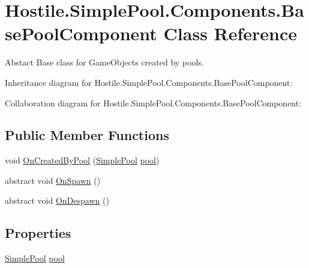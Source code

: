 \hypertarget{class_hostile_1_1_simple_pool_1_1_components_1_1_base_pool_component}{\section{Hostile.\-Simple\-Pool.\-Components.\-Base\-Pool\-Component Class Reference}
\label{class_hostile_1_1_simple_pool_1_1_components_1_1_base_pool_component}
}


Abstact Base class for Game\-Objects created by pools.  




Inheritance diagram for Hostile.\-Simple\-Pool.\-Components.\-Base\-Pool\-Component\-:


Collaboration diagram for Hostile.\-Simple\-Pool.\-Components.\-Base\-Pool\-Component\-:
\subsection*{Public Member Functions}
\begin{DoxyCompactItemize}
\item 
void \hyperlink{class_hostile_1_1_simple_pool_1_1_components_1_1_base_pool_component_a321fc31c13e8a143a090822ee7b9eb02}{On\-Created\-By\-Pool} (\hyperlink{class_hostile_1_1_simple_pool_1_1_simple_pool}{Simple\-Pool} \hyperlink{class_hostile_1_1_simple_pool_1_1_components_1_1_base_pool_component_ac2a2a4f41f20b50d8f3c2ea545461c72}{pool})
\item 
abstract void \hyperlink{class_hostile_1_1_simple_pool_1_1_components_1_1_base_pool_component_ae79737959baf9cdf23d2bf77fc359cf7}{On\-Spawn} ()
\item 
abstract void \hyperlink{class_hostile_1_1_simple_pool_1_1_components_1_1_base_pool_component_acee7cd5b2e3790c85b0b7816d6578d72}{On\-Despawn} ()
\end{DoxyCompactItemize}
\subsection*{Properties}
\begin{DoxyCompactItemize}
\item 
\hyperlink{class_hostile_1_1_simple_pool_1_1_simple_pool}{Simple\-Pool} \hyperlink{class_hostile_1_1_simple_pool_1_1_components_1_1_base_pool_component_ac2a2a4f41f20b50d8f3c2ea545461c72}{pool}
\end{DoxyCompactItemize}


